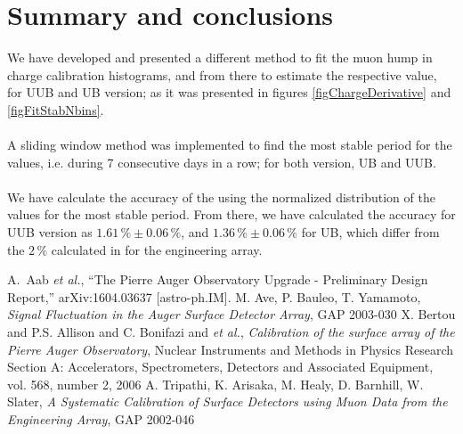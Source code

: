 \documentclass[twoside, final, 10pt]{articleMine}
\begin{document}
\section{Summary and conclusions}
We have developed and presented a different method to fit the
muon hump in charge calibration histograms, and from there to
estimate the respective \qpkvem value, for UUB and UB
version; as it was presented in figures \ref{figChargeDerivative}
and \ref{figFitStabNbins}.\\\\A sliding window method was
implemented to find the most stable period for the \qpkvem
values, i.e. during 7 consecutive days in a row; for both
version, UB and UUB.\\\\We have calculate the accuracy of the
\qpkvem using the normalized distribution of the \qpkvem values
for the most stable period. From there, we have calculated the
accuracy for UUB version as $1.61\,\%\pm0.06\,\%$, and
$1.36\,\%\pm0.06\,\%$ for UB, which differ from the $2\,\%$
calculated in \cite{gap2002-046} for the engineering array.



\begin{thebibliography}{}
  \setlength{\itemsep}{0.0pt}
      A.~Aab \textit{et al.}, ``The Pierre Auger Observatory
      Upgrade - Preliminary Design Report,'' arXiv:1604.03637
      [astro-ph.IM].
     M. Ave, P. Bauleo, T. Yamamoto,
      {\em Signal Fluctuation in the Auger Surface Detector
      Array}, GAP 2003-030
     X. Bertou and P.S. Allison 
      and C. Bonifazi and \textit{et al.}, {\em Calibration of
      the surface array of the Pierre Auger Observatory}, Nuclear
      Instruments and Methods in Physics Research Section A:
      Accelerators, Spectrometers, Detectors and Associated
      Equipment, vol. 568, number 2, 2006 
     A. Tripathi, K. Arisaka, M. Healy, D.
      Barnhill, W. Slater, {\em A Systematic Calibration of
      Surface Detectors using Muon Data from the Engineering
      Array}, GAP 2002-046
\end{thebibliography}
\end{document}
